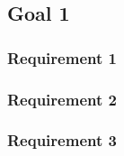 \subsection{Goal 1}

\setcounter{secnumdepth}{3}
\subsubsection{Requirement 1}
\subsubsection{Requirement 2}
\subsubsection{Requirement 3}